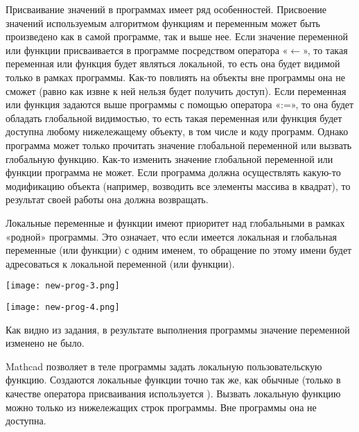 Присваивание значений в программах имеет ряд особенностей. Присвоение значений используемым алгоритмом функциям и переменным может быть произведено как в самой программе, так и выше нее. Если значение переменной или функции присваивается в программе посредством оператора «$\leftarrow$», то такая переменная или функция будет являться локальной, то есть она будет видимой только в рамках программы. Как-то повлиять на объекты вне программы она не сможет (равно как извне к ней нельзя будет получить доступ). Если переменная или функция задаются выше программы с помощью оператора «:=», то она будет обладать глобальной видимостью, то есть такая переменная или функция будет доступна любому нижележащему объекту, в том числе и коду программ. Однако программа может только прочитать значение глобальной переменной или вызвать глобальную функцию. Как-то изменить значение глобальной переменной или функции программа не может. Если программа должна осуществлять какую-то модификацию объекта (например, возводить все элементы массива в квадрат), то результат своей работы она должна возвращать.

Локальные переменные и функции имеют приоритет над глобальными в рамках «родной» программы. Это означает, что если имеется локальная и глобальная переменные (или функции) с одним именем, то обращение по этому имени будет адресоваться к локальной переменной (или функции).


\begin{center}
	\texttt{[image: new-prog-3.png]}
\end{center}


\begin{center}
	\texttt{[image: new-prog-4.png]}
\end{center}

Как видно из задания, в результате выполнения программы значение переменной  изменено не было.

Mathcad позволяет в теле программы задать локальную пользовательскую функцию. Создаются локальные функции точно так же, как обычные (только в качестве оператора присваивания используется ). Вызвать локальную функцию можно только из нижележащих строк программы. Вне программы она не доступна.

